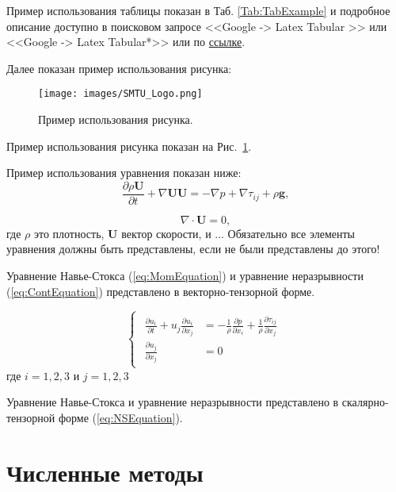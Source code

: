 \documentclass[11pt]{article}
\begin{document}
Пример использования таблицы показан в Таб. \ref{Tab:TabExample} и подробное описание доступно в поисковом запросе <<Google -> Latex Tabular >> или <<Google -> Latex Tabular*>> или по \textcolor{blue}{\href{https://en.wikibooks.org/wiki/LaTeX/Tables}{ссылке}}.	
	
Далее показан пример использования рисунка:
\begin{figure}[htb]
\centering
\texttt{[image: images/SMTU\_Logo.png]}\\[1cm]  
\caption{Пример использования рисунка.}
\label{fig:FigExample}
\end{figure}	
	
Пример использования рисунка показан на Рис.~\ref{fig:FigExample}.	

Пример использования уравнения показан ниже:
%
\begin{equation}
\frac{\partial \rho \mathbf{U}}{\partial t } + \nabla \mathbf{U} \mathbf{U} = -\nabla p + \nabla \tau_{ij} + \rho \mathbf{g},
\label{eq:MomEquation}
\end{equation}

\begin{equation}
\nabla \cdot \mathbf{U}=0,
\label{eq:ContEquation}
\end{equation}
%
где $\rho$ это плотность, $\mathbf{U}$ вектор скорости, и ... Обязательно все элементы уравнения должны быть представлены, если не были представлены до этого! 

Уравнение Навье-Стокса (\ref{eq:MomEquation}) и уравнение неразрывности (\ref{eq:ContEquation}) представлено в векторно-тензорной форме.

\begin{equation}
\begin{cases}
	\begin{aligned}
		\frac{\partial u_{i}}{\partial t}+u_{j}\frac{\partial u_{i}}{\partial x_{j}} &=-\frac{1}{\rho}\frac{\partial p}{\partial x_{i}}+\frac{1}{\rho}\frac{\partial \tau_{ij}}{\partial x_{j}}\\
		\frac{\partial u_{j}}{\partial x_{j}} &=0
	\end{aligned}
\end{cases}
\label{eq:NSEquation}
\end{equation}
где $i=1,2,3$ и $j=1,2,3$

Уравнение Навье-Стокса и уравнение неразрывности представлено в скалярно-тензорной форме (\ref{eq:NSEquation}).

\section{Численные методы}\label{sec:NumMethod}
\end{document}
